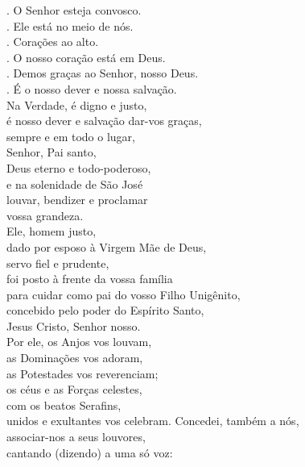 \documentclass{book}
\begin{document}
\begin{flushleft}
    {\color{VioletRed2} \Vbar.} O Senhor esteja convosco. \\
    {\color{VioletRed2} \Rbar.} Ele está no meio de nós. \\
    {\color{VioletRed2} \Vbar.} Corações ao alto. \\
    {\color{VioletRed2} \Rbar.} O nosso coração está em Deus. \\
    {\color{VioletRed2} \Vbar.} Demos graças ao Senhor, nosso Deus. \\
    {\color{VioletRed2} \Rbar.} É o nosso dever e nossa salvação.
    \vspace{.2cm} \\
    Na Verdade, é digno e justo, \\
    é nosso dever e salvação dar-vos graças, \\
    sempre e em todo o lugar, \\
    Senhor, Pai santo, \\
    Deus eterno e todo-poderoso, \\
    e na solenidade de São José \\
    louvar, bendizer e proclamar \\
    vossa grandeza.
    \vspace{.2cm} \\
    Ele, homem justo, \\
    dado por esposo à Virgem Mãe de Deus, \\
    servo fiel e prudente, \\
    foi posto à frente da vossa família \\
    para cuidar como pai do vosso Filho Unigênito, \\
    concebido pelo poder do Espírito Santo, \\
    Jesus Cristo, Senhor nosso.
    \vspace{.2cm} \\
    Por ele, os Anjos vos louvam, \\
    as Dominações vos adoram, \\
    as Potestades vos reverenciam; \\
    os céus e as Forças celestes, \\
    com os beatos Serafins, \\
    unidos e exultantes vos celebram.
    Concedei, também a nós, \\
    associar-nos a seus louvores, \\
    cantando {\color{VioletRed2}(}dizendo{\color{VioletRed2})} a uma só voz:

\end{flushleft}
\end{document}
